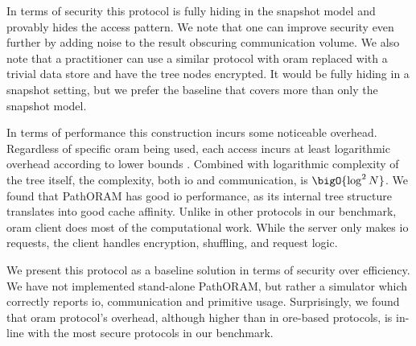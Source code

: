		In terms of security this protocol is fully hiding in the snapshot model and provably hides the access pattern.
		We note that one can improve security even further by adding noise to the result obscuring communication volume.
		We also note that a practitioner can use a similar protocol with \acrshort{oram} replaced with a trivial data store and have the tree nodes encrypted.
		It would be fully hiding in a snapshot setting, but we prefer the baseline that covers more than only the snapshot model.

		In terms of performance this construction incurs some noticeable overhead.
		Regardless of specific \acrshort{oram} being used, each access incurs at least logarithmic overhead according to lower bounds \cite{oram-original}.
		Combined with logarithmic complexity of the {\BPlus} tree itself, the complexity, both \acrshort{io} and communication, is $\bigO{\log^2 N}$.
		We found that PathORAM has good \acrshort{io} performance, as its internal tree structure translates into good cache affinity.
		Unlike in other protocols in our benchmark, \acrshort{oram} client does most of the computational work.
		While the server only makes \acrshort{io} requests, the client handles encryption, shuffling, and request logic.

		We present this protocol as a baseline solution in terms of security over efficiency.
		We have not implemented stand-alone PathORAM, but rather a simulator which correctly reports \acrshort{io}, communication and primitive usage.
		Surprisingly, we found that \acrshort{oram} protocol's overhead, although higher than in \acrshort{ore}-based protocols, is in-line with the most secure protocols in our benchmark.
